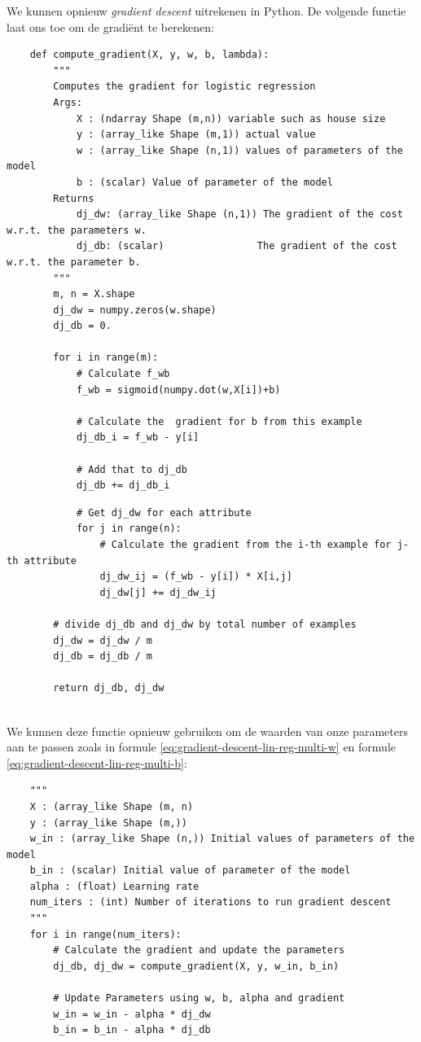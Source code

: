 We kunnen opnieuw \textit{gradient descent} uitrekenen in Python. De volgende functie laat ons toe om de gradiënt te berekenen:
\begin{lstlisting}
	def compute_gradient(X, y, w, b, lambda): 
	    """
	    Computes the gradient for logistic regression 
	    Args:
	        X : (ndarray Shape (m,n)) variable such as house size 
	        y : (array_like Shape (m,1)) actual value 
	        w : (array_like Shape (n,1)) values of parameters of the model      
	        b : (scalar) Value of parameter of the model 
	    Returns
	        dj_dw: (array_like Shape (n,1)) The gradient of the cost w.r.t. the parameters w. 
	        dj_db: (scalar)                The gradient of the cost w.r.t. the parameter b. 
	    """
	    m, n = X.shape
	    dj_dw = numpy.zeros(w.shape)
	    dj_db = 0.
	
	    for i in range(m):
	        # Calculate f_wb
	        f_wb = sigmoid(numpy.dot(w,X[i])+b)
	
	        # Calculate the  gradient for b from this example
	        dj_db_i = f_wb - y[i]
	
	        # Add that to dj_db
	        dj_db += dj_db_i
\end{lstlisting}
\newpage
\begin{lstlisting}	
	        # Get dj_dw for each attribute
	        for j in range(n):
	            # Calculate the gradient from the i-th example for j-th attribute
	            dj_dw_ij = (f_wb - y[i]) * X[i,j]
	            dj_dw[j] += dj_dw_ij
	
	    # divide dj_db and dj_dw by total number of examples
	    dj_dw = dj_dw / m
	    dj_db = dj_db / m
	
	    return dj_db, dj_dw
\end{lstlisting}
\noindent
\\
We kunnen deze functie opnieuw gebruiken om de waarden van onze parameters aan te passen zoals in formule \ref{eq:gradient-descent-lin-reg-multi-w} en formule \ref{eq:gradient-descent-lin-reg-multi-b}:
\begin{lstlisting}
	"""
	X : (array_like Shape (m, n)
	y : (array_like Shape (m,))
	w_in : (array_like Shape (n,)) Initial values of parameters of the model
	b_in : (scalar) Initial value of parameter of the model
	alpha : (float) Learning rate
	num_iters : (int) Number of iterations to run gradient descent
	"""
	for i in range(num_iters):
	    # Calculate the gradient and update the parameters
	    dj_db, dj_dw = compute_gradient(X, y, w_in, b_in)   
	
	    # Update Parameters using w, b, alpha and gradient
	    w_in = w_in - alpha * dj_dw               
	    b_in = b_in - alpha * dj_db 
\end{lstlisting}

